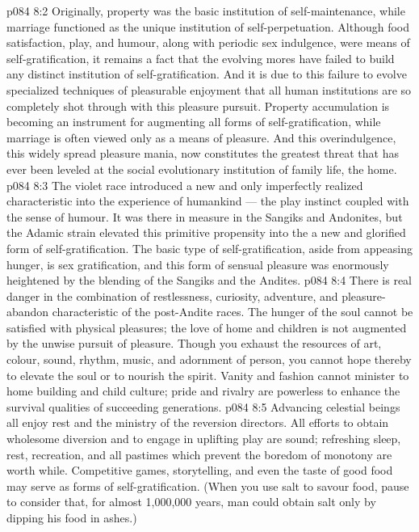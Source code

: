 \vs p084 8:2 Originally, property was the basic institution of self\hyp{}maintenance, while marriage functioned as the unique institution of self\hyp{}perpetuation. Although food satisfaction, play, and humour, along with periodic sex indulgence, were means of self\hyp{}gratification, it remains a fact that the evolving mores have failed to build any distinct institution of self\hyp{}gratification. And it is due to this failure to evolve specialized techniques of pleasurable enjoyment that all human institutions are so completely shot through with this pleasure pursuit. Property accumulation is becoming an instrument for augmenting all forms of self\hyp{}gratification, while marriage is often viewed only as a means of pleasure. And this overindulgence, this widely spread pleasure mania, now constitutes the greatest threat that has ever been leveled at the social evolutionary institution of family life, the home.
\vs p084 8:3 The violet race introduced a new and only imperfectly realized characteristic into the experience of humankind --- the play instinct coupled with the sense of humour. It was there in measure in the Sangiks and Andonites, but the Adamic strain elevated this primitive propensity into the  a new and glorified form of self\hyp{}gratification. The basic type of self\hyp{}gratification, aside from appeasing hunger, is sex gratification, and this form of sensual pleasure was enormously heightened by the blending of the Sangiks and the Andites.
\vs p084 8:4 There is real danger in the combination of restlessness, curiosity, adventure, and pleasure\hyp{}abandon characteristic of the post\hyp{}Andite races. The hunger of the soul cannot be satisfied with physical pleasures; the love of home and children is not augmented by the unwise pursuit of pleasure. Though you exhaust the resources of art, colour, sound, rhythm, music, and adornment of person, you cannot hope thereby to elevate the soul or to nourish the spirit. Vanity and fashion cannot minister to home building and child culture; pride and rivalry are powerless to enhance the survival qualities of succeeding generations.
\vs p084 8:5 Advancing celestial beings all enjoy rest and the ministry of the reversion directors. All efforts to obtain wholesome diversion and to engage in uplifting play are sound; refreshing sleep, rest, recreation, and all pastimes which prevent the boredom of monotony are worth while. Competitive games, storytelling, and even the taste of good food may serve as forms of self\hyp{}gratification. (When you use salt to savour food, pause to consider that, for almost 1,000,000 years, man could obtain salt only by dipping his food in ashes.)
